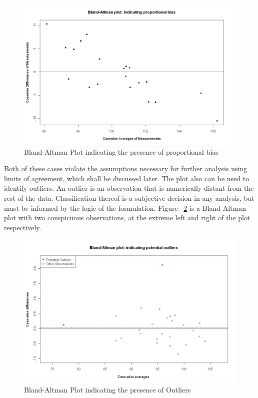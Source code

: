 \documentclass[12pt, a4paper]{report}
\theoremstyle{plain}
\theoremstyle{definition}
\theoremstyle{remark}
\begin{document}
	\begin{figure}[h!]
		\begin{center}
			\includegraphics[width=110mm]{images/PropBias.jpeg}
			\caption{Bland-Altman Plot indicating the presence of proportional bias}\label{PropBias}
		\end{center}
	\end{figure}
Both of these cases violate the assumptions necessary for further analysis using limits of agreement, which shall be discussed later. The plot also can be used to identify	outliers. An outlier is an observation that is numerically distant from the rest of the data. Classification thereof is a subjective decision in any analysis, but must be informed by the logic of the formulation. Figure ~\ref{BAOutliers} is a Bland Altman plot with two
	conspicuous observations, at the extreme left and right of the
	plot respectively.
	
	
	\begin{figure}[h!]
		\begin{center}
			\includegraphics[width=125mm]{images/BAOutliers.jpeg}
			\caption{Bland-Altman Plot indicating the presence of Outliers}\label{BAOutliers}
		\end{center}
	\end{figure}
	
\end{document}
